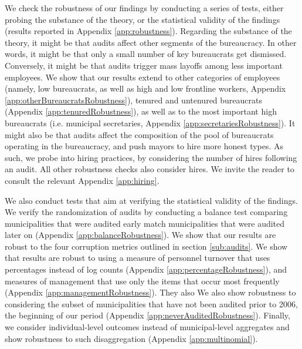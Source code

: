 \documentclass[12pt,a4paper]{article}
\theoremstyle{definition}
\begin{document}
We check the robustness of our findings by conducting a series of tests, either probing the substance of the theory, or the statistical validity of the findings (results reported in Appendix \ref{app:robustness}). Regarding the substance of the theory, it might be that audits affect other segments of the bureaucracy. In other words, it might be that only a small number of key bureaucrats get dismissed. Conversely, it might be that audits trigger mass layoffs among less important employees. We show that our results extend to other categories of employees (namely, low bureaucrats, as well as high and low frontline workers, Appendix \ref{app:otherBureaucratsRobustness}), tenured and untenured bureaucrats (Appendix \ref{app:tenuredRobustness}), as well as to the most important high bureaucrats (i.e. municipal secretaries, Appendix \ref{app:secretariesRobustness}). It might also be that audits affect the composition of the pool of bureaucrats operating in the bureaucracy, and push mayors to hire more honest types. As such, we probe into hiring practices, by considering the number of hires following an audit. All other robustness checks also consider hires. We invite the reader to consult the relevant Appendix \ref{app:hiring}. %

We also conduct tests that aim at verifying the statistical validity of the findings. We verify the randomization of audits by conducting a balance test comparing municipalities that were audited early match municipalities that were audited later on (Appendix \ref{app:balanceRobustness}). We show that our results are robust to the four corruption metrics outlined in section \ref{sub:audits}. We show that results are robust to using a measure of personnel turnover that uses percentages instead of log counts (Appendix \ref{app:percentageRobustness}), and measures of management that use only the items that occur most frequently (Appendix \ref{app:managementRobustness}). They also  We also show robustness to considering the subset of municipalities that have not been audited prior to 2006, the beginning of our period (Appendix \ref{app:neverAuditedRobustness}). Finally, we consider individual-level outcomes instead of municipal-level aggregates and show robustness to such disaggregation (Appendix \ref{app:multinomial}). 
\end{document}
